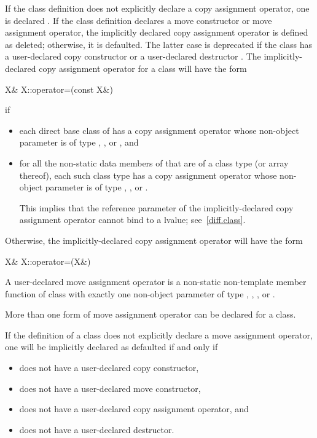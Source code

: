 \pnum
If the class definition does not explicitly declare a copy assignment operator,
one is declared .
If the class definition declares a move
constructor or move assignment operator, the implicitly declared copy
assignment operator is defined as deleted; otherwise, it is
defaulted.
The latter case is deprecated if the class has a user-declared copy constructor
or a user-declared destructor .
The implicitly-declared copy assignment operator for a class
will have the form
\begin{codeblock}
X& X::operator=(const X&)
\end{codeblock}
if
\begin{itemize}
\item
each direct base class  of 
has a copy assignment operator whose non-object parameter is of type
, , or , and
\item
for all the non-static data members of 
that are of a class type  (or array thereof),
each such class type has a copy assignment operator whose non-object parameter is of type
, ,
or .
\begin{footnote}
This implies that the reference parameter of the
implicitly-declared copy assignment operator cannot bind to a
 lvalue; see~\ref{diff.class}.
\end{footnote}
\end{itemize}

Otherwise, the implicitly-declared copy assignment operator
will have the form
\begin{codeblock}
X& X::operator=(X&)
\end{codeblock}

\pnum
A user-declared move assignment operator  is
a non-static non-template member function of class  with exactly
one non-object parameter of type , , , or
.
\begin{note}
More than one form of move assignment operator can be declared for a class.
\end{note}

\pnum
{}%
If the definition of a class  does not explicitly declare a
move assignment operator, one
will be implicitly declared as defaulted if and only if
\begin{itemize}
\item
{} does not have a user-declared copy constructor,

\item
{} does not have a user-declared move constructor,

\item
{} does not have a user-declared copy assignment operator, and

\item
{} does not have a user-declared destructor.
\end{itemize}

